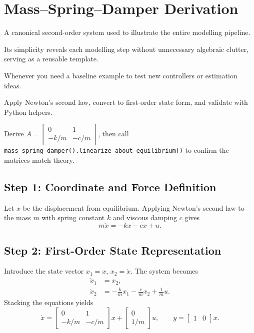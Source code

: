 \section{Mass--Spring--Damper Derivation}
\begin{beginnerguide}
    \item[\textbf{What?}] A canonical second-order system used to illustrate the entire modelling pipeline.
    \item[\textbf{Why?}] Its simplicity reveals each modelling step without unnecessary algebraic clutter, serving as a reusable template.
    \item[\textbf{When?}] Whenever you need a baseline example to test new controllers or estimation ideas.
    \item[\textbf{How?}] Apply Newton’s second law, convert to first-order state form, and validate with Python helpers.
    \item[\textbf{Example}] Derive $A=\begin{bmatrix}0&1\\-k/m&-c/m\end{bmatrix}$, then call \texttt{mass\_spring\_damper().linearize\_about\_equilibrium()} to confirm the matrices match theory.
\end{beginnerguide}
\subsection{Step 1: Coordinate and Force Definition}
Let $x$ be the displacement from equilibrium. Applying Newton's second law to the mass $m$ with spring constant $k$ and viscous damping $c$ gives
\[
    m \ddot{x} = -k x - c \dot{x} + u.
\]

\subsection{Step 2: First-Order State Representation}
Introduce the state vector $x_1 = x$, $x_2 = \dot{x}$. The system becomes
\begin{align*}
    \dot{x}_1 &= x_2,\\
    \dot{x}_2 &= -\frac{k}{m} x_1 - \frac{c}{m} x_2 + \frac{1}{m} u.
\end{align*}
Stacking the equations yields
\[
    \dot{x} = \begin{bmatrix} 0 & 1 \\ -k/m & -c/m \end{bmatrix} x + \begin{bmatrix} 0 \\ 1/m \end{bmatrix} u,\qquad
    y = \begin{bmatrix} 1 & 0 \end{bmatrix} x.
\]

